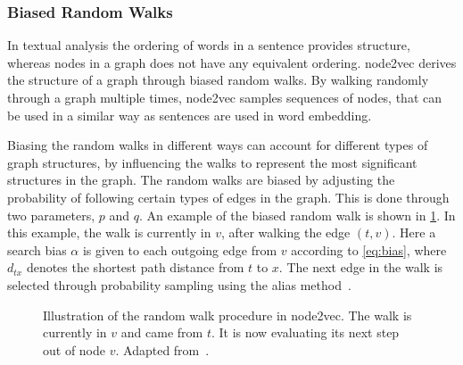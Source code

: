 
\subsubsection{Biased Random Walks}
In textual analysis the ordering of words in a sentence provides structure, whereas nodes in a graph does not have any equivalent ordering. node2vec derives the structure of a graph through biased random walks. By walking randomly through a graph multiple times,
node2vec samples sequences of nodes, that can be used in a similar way as sentences are used in word embedding.

Biasing the random walks in different ways can account for different types of graph structures, by influencing the walks to represent the most significant structures in the graph. The random walks are biased by adjusting the probability of following certain types of edges in the graph. This is done through two parameters, $p$ and $q$. An example of the biased random walk is shown in \cref{fig:randomwalk}. In this example, the walk is currently in $v$, after walking the edge $(t,v)$. Here a search bias $\alpha$ is given to each outgoing edge from $v$ according to \cref{eq:bias}, where $d_{tx}$ denotes the shortest path distance from $t$ to $x$. The next edge in the walk is selected through probability sampling using the alias method~\cite{alias-method}.

\begin{figure}%
  \centering
  
\caption[Illustration of random walk in node2vec]{Illustration of the random walk procedure in node2vec. The walk is currently in $v$ and came from $t$. It is now evaluating its next step out of node $v$. Adapted from~\cite{node2vec}.}%
\label{fig:randomwalk}%
\end{figure}


